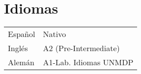 \begin{adjustbox}{valign=t}
\begin{minipage}{0.34\textwidth}
\section*{Idiomas}
\begin{tabular}{ll}
	Español 	&  Nativo \\
	Inglés 		& A2 (Pre-Intermediate)\\
	Alemán      & A1-Lab. Idiomas UNMDP
 \end{tabular}
\end{minipage}
\end{adjustbox}
\hfill
\begin{adjustbox}{valign=t}
\begin{minipage}{0.001\textwidth} %
\MyVerticalRule  %
\end{minipage}
\end{adjustbox}
\hfill
